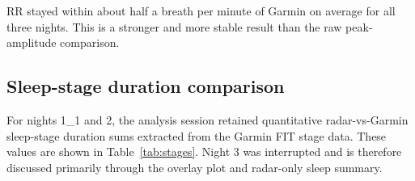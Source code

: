\documentclass[11pt,a4paper]{article}
\begin{document}
\begin{table}[H]
\centering
\caption{Sleep-only respiration-rate comparison between radar and Garmin.}
\label{tab:rr}
\end{table}

RR stayed within about half a breath per minute of Garmin on average for all three nights. This is a stronger and more stable result than the raw peak-amplitude comparison.

\subsection{Sleep-stage duration comparison}
For nights 1\_1 and 2, the analysis session retained quantitative radar-vs-Garmin sleep-stage duration sums extracted from the Garmin FIT stage data. These values are shown in Table~\ref{tab:stages}. Night 3 was interrupted and is therefore discussed primarily through the overlay plot and radar-only sleep summary.

\begin{table}[H]
\centering
\caption{Sleep-stage duration sums for nights 1\_1 and 2. Positive difference means radar assigned more time to that stage than Garmin.}
\label{tab:stages}
\end{table}
\end{document}

